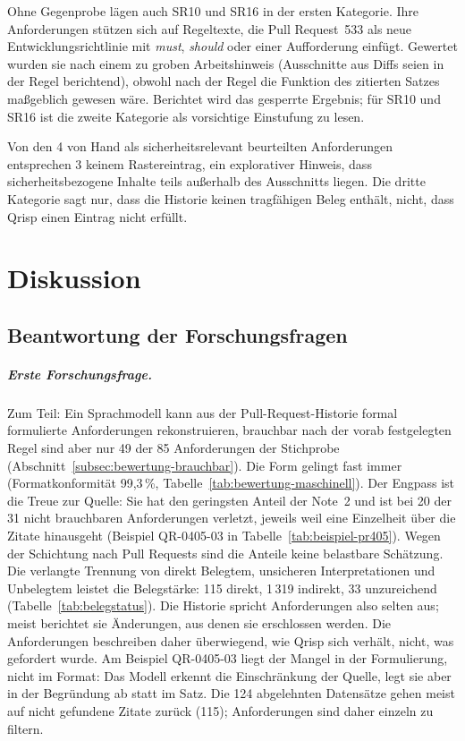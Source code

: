 \documentclass[11pt,a4paper]{report}
\begin{document}
Ohne Gegenprobe lägen auch SR10 und SR16 in der ersten Kategorie. Ihre
Anforderungen stützen sich auf Regeltexte, die Pull Request~533 als neue
Entwicklungsrichtlinie mit \emph{must}, \emph{should} oder einer
Aufforderung einfügt. Gewertet wurden sie nach einem zu groben
Arbeitshinweis (Ausschnitte aus Diffs seien in der Regel berichtend),
obwohl nach der Regel die Funktion des zitierten Satzes maßgeblich gewesen
wäre. Berichtet wird das gesperrte Ergebnis; für SR10 und SR16 ist die
zweite Kategorie als vorsichtige Einstufung zu lesen.

Von den 4 von Hand als sicherheitsrelevant beurteilten Anforderungen
entsprechen 3 keinem Rastereintrag, ein explorativer Hinweis, dass
sicherheitsbezogene Inhalte teils außerhalb des Ausschnitts liegen. Die
dritte Kategorie sagt nur, dass die Historie keinen tragfähigen Beleg
enthält, nicht, dass Qrisp einen Eintrag nicht erfüllt.


\chapter{Diskussion}
\label{cha:diskussion}

\section{Beantwortung der Forschungsfragen}
\label{sec:disk-ff}

\paragraph{Erste Forschungsfrage.} Zum Teil: Ein Sprachmodell kann aus
der Pull-Request-Historie formal formulierte Anforderungen
rekonstruieren, brauchbar nach der vorab festgelegten Regel sind aber nur
49 der 85 Anforderungen der Stichprobe
(Abschnitt~\ref{subsec:bewertung-brauchbar}). Die Form gelingt fast immer
(Formatkonformität 99,3\,\%, Tabelle~\ref{tab:bewertung-maschinell}).
Der Engpass ist die Treue zur Quelle: Sie hat den geringsten Anteil
der Note~2 und ist bei 20 der 31 nicht brauchbaren Anforderungen
verletzt, jeweils weil eine Einzelheit über die Zitate hinausgeht
(Beispiel QR-0405-03 in Tabelle~\ref{tab:beispiel-pr405}). Wegen der
Schichtung nach Pull Requests sind die Anteile keine belastbare Schätzung.
Die verlangte Trennung von direkt Belegtem, unsicheren Interpretationen
und Unbelegtem leistet die Belegstärke: 115 direkt, 1\,319 indirekt, 33
unzureichend (Tabelle~\ref{tab:belegstatus}). Die Historie spricht
Anforderungen also selten aus; meist berichtet sie Änderungen, aus denen
sie erschlossen werden. Die Anforderungen beschreiben daher
überwiegend, wie Qrisp sich verhält, nicht, was gefordert wurde. Am
Beispiel QR-0405-03 liegt der Mangel in der Formulierung, nicht im
Format: Das Modell erkennt die Einschränkung der Quelle, legt sie aber in
der Begründung ab statt im Satz. Die 124 abgelehnten Datensätze gehen
meist auf nicht gefundene Zitate zurück (115); Anforderungen sind daher
einzeln zu filtern.
\end{document}
